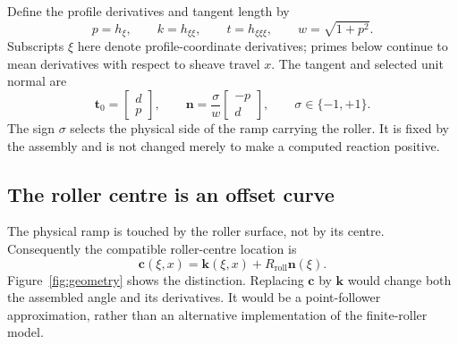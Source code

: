 \documentclass[11pt,letterpaper]{article}
\numberwithin{equation}{section}
\begin{document}
Define the profile derivatives and tangent length by
\begin{equation}
  p=h_{\xi},\qquad k=h_{\xi\xi},\qquad t=h_{\xi\xi\xi},
  \qquad w=\sqrt{1+p^2}.
\end{equation}
Subscripts $\xi$ here denote profile-coordinate derivatives; primes below continue to mean derivatives with respect to sheave travel $x$. The tangent and selected unit normal are
\begin{equation}
  \bm t_0=\begin{bmatrix}d\\p\end{bmatrix},
  \qquad
  \bm n=\frac{\sigma}{w}\begin{bmatrix}-p\\d\end{bmatrix},
  \qquad \sigma\in\{-1,+1\}.
  \label{eq:normal}
\end{equation}
The sign $\sigma$ selects the physical side of the ramp carrying the roller. It is fixed by the assembly and is not changed merely to make a computed reaction positive.

\subsection{The roller centre is an offset curve}

The physical ramp is touched by the roller surface, not by its centre. Consequently the compatible roller-centre location is
\begin{equation}
  \bm c(\xi,x)=\bm k(\xi,x)+R_{\mathrm{roll}}\bm n(\xi).
  \label{eq:offset}
\end{equation}
Figure~\ref{fig:geometry} shows the distinction. Replacing $\bm c$ by $\bm k$ would change both the assembled angle and its derivatives. It would be a point-follower approximation, rather than an alternative implementation of the finite-roller model.
\end{document}
